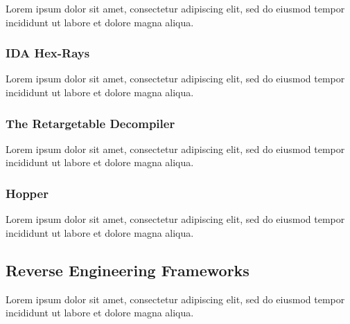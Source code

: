\documentclass[12pt, a4paper]{article}
\begin{document}
Lorem ipsum dolor sit amet, consectetur adipiscing elit, sed do eiusmod tempor incididunt ut labore et dolore magna aliqua.

\cite{boomerang}


\subsubsection{IDA Hex-Rays}

Lorem ipsum dolor sit amet, consectetur adipiscing elit, sed do eiusmod tempor incididunt ut labore et dolore magna aliqua.

\cite{hexrays}


\subsubsection{The Retargetable Decompiler}


Lorem ipsum dolor sit amet, consectetur adipiscing elit, sed do eiusmod tempor incididunt ut labore et dolore magna aliqua.

\cite{retargetable_decomp}


\subsubsection{Hopper}


Lorem ipsum dolor sit amet, consectetur adipiscing elit, sed do eiusmod tempor incididunt ut labore et dolore magna aliqua.


\subsection{Reverse Engineering Frameworks}

Lorem ipsum dolor sit amet, consectetur adipiscing elit, sed do eiusmod tempor incididunt ut labore et dolore magna aliqua.
\end{document}
